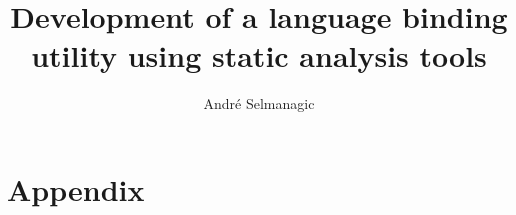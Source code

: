 \author{André Selmanagic}
\title{Development of a language binding utility using static analysis tools}






\newpage
\thispagestyle{empty}
\mbox{}
\newpage





\frontmatter
\mainmatter





\part{Appendix}
\backmatter



